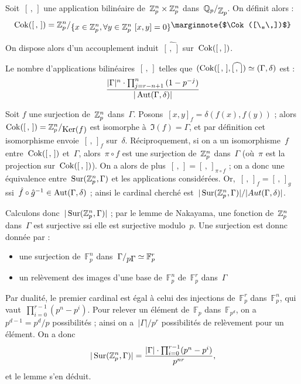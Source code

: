 Soit~$[\,,\,]$ une application bilinéaire de~$\mathbb{Z}_p^n\times\mathbb{Z}_p^n$ dans~$\quotient{\mathbb Q_p}{\Zp}$. On définit alors :
\[ \Cok([\,,\,]) = \quotient{\Zp^n}{\{ x\in\Zp^n,\forall y\in\Zp^n\ [x,y]=0 \}} \text{\marginnote{$\Cok([\,,\,])$}}\]

\begin{rem}
On dispose alors d'un accouplement induit~${\widehat{[\,,\,]}}$ sur~$\operatorname{Cok}([\,,\,])$.
\end{rem}

\begin{lem}
Le nombre d'applications bilinéaires~$[\,,\,]$ telles que~$(\operatorname{Cok}([\,,\,], \widehat{[\,,\,]}) \simeq (\Gamma, \delta)$ est :
\[ \frac{|\Gamma|^n\cdot\prod_{j=r-n+1}^{n}{(1-p^{-j})}}{|\operatorname{Aut}(\Gamma, \delta)|} \]
\end{lem}
\begin{dem}
Soit $f$ une surjection de~$\mathbb{Z}_p^n$ dans~$\Gamma$.
Posons~$[x,y]_f = \delta(f(x),f(y))$ ; alors~$\Cok([\,,\,]) = \quotient{\Zp^n}{\Ker(f)}$ est isomorphe à~$\Im(f)=\Gamma$, et par définition cet isomorphisme envoie~$[\,,\,]_f$ sur~$\delta$.
Réciproquement, si on a un isomorphisme~$f$ entre~$\operatorname{Cok}([\,,\,])$ et~$\Gamma$, alors~$\pi\circ f$ est une surjection de~$\mathbb{Z}_p^n$ dans~$\Gamma$ (où~$\pi$ est la projection sur~$\operatorname{Cok}([\,,\,])$).
On a alors de plus~$[\,,\,] = [\,,\,]_{\pi\circ f}$ ; on a donc une équivalence entre~$\operatorname{Sur}(\mathbb{Z}_p^n, \Gamma)$ et les applications considérées.
Or,~$[\,,\,]_f = [\,,\,]_g$  ssi~$\hat f\circ \hat g^{-1}\in \operatorname{Aut}(\Gamma, \delta)$ ; ainsi le cardinal cherché est~$|\operatorname{Sur}(\mathbb{Z}_p^n,\Gamma)|/|Aut(\Gamma, \delta)|$.

Calculons donc~$|\operatorname{Sur}(\mathbb{Z}_p^n,\Gamma)|$ ; par le lemme de Nakayama, une fonction de~$\mathbb{Z}_p^n$ dans~$\Gamma$ est surjective ssi elle est surjective modulo~$p$. Une surjection est donnc donnée par :
\begin{itemize}
\item une surjection de~$\mathbb{F}_p^n$ dans~$\quotient{\Gamma}{p\Gamma}\simeq\mathbb{F}_p^r$
\item un relèvement des images d'une base de~$\mathbb F_p^n$ de~$\mathbb F_p^r$ dans~$\Gamma$
\end{itemize}
Par dualité, le premier cardinal est égal à celui des injections de~$\mathbb F_p^r$ dans~$\mathbb F_p^n$, qui vaut~$\prod_{i=0}^{r-1}{(p^n-p^i)}$.
Pour relever un élément de~$\mathbb F_p$ dans~$\mathbb F_{p^d}$, on a~$p^{d-1}=p^d/p$ possibilités ; ainsi on a~$|\Gamma|/p^r$ possibilités de relèvement pour un élément. On a donc
\[ |\operatorname{Sur}(\mathbb{Z}_p^n, \Gamma)| = \frac{|\Gamma|\cdot \prod_{i=0}^{r-1}(p^n-p^i)}{p^{nr}}, \]
et le lemme s'en déduit.
\end{dem}

